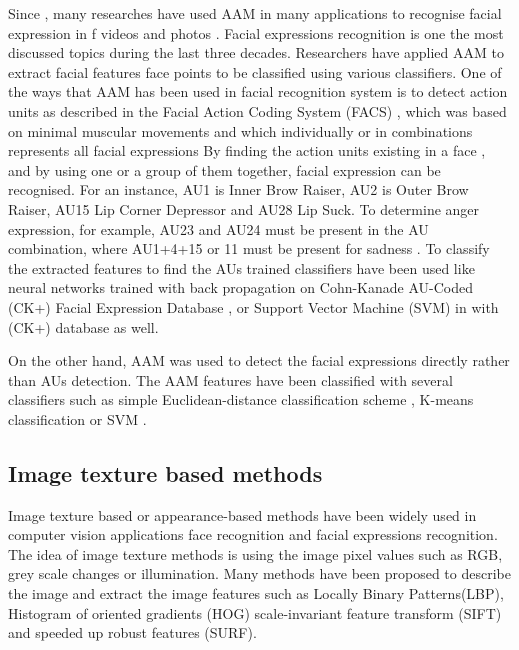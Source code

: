Since \citet{edwards1998interpreting}, many researches have used AAM in many applications to  recognise facial expression in f videos \cite{sung2006real, martin2008real} and photos \cite{kanade2000comprehensive, van2005model,wu2013facial} . Facial expressions recognition is one the most discussed topics during the last three decades. Researchers have applied AAM to extract facial features face points to be classified using various classifiers. One of the ways that AAM has been used in facial recognition system is to detect action units as described in the Facial Action Coding System (FACS) \cite{ekman1978facial}, which was based on minimal muscular movements  and which individually or in combinations  represents all facial expressions \citep{cohn1998feature, van2005model,lucey2010extended} By finding  the action units existing in a face , and by using one or a group of them together, facial expression can be recognised. For an instance, AU1 is Inner Brow Raiser, AU2 is Outer Brow Raiser, AU15 Lip Corner Depressor and AU28 Lip Suck. To determine anger expression, for example, AU23 and AU24 must be present in the AU combination, where AU1+4+15 or 11 must be present for sadness \cite{lucey2010extended}. 
To classify the extracted features to find the AUs trained classifiers have been used like neural networks trained with back propagation \citet{van2005model} on Cohn-Kanade AU-Coded (CK+) Facial Expression Database \citet{kanade2000comprehensive}, or Support Vector Machine (SVM) in \citet{lucey2010extended} with (CK+) database as well.     

On the other hand, AAM was used to detect the facial expressions directly rather than AUs detection. The AAM features have been classified with several classifiers such as simple Euclidean-distance classification scheme \cite{ratliff2008emotion},  K-means classification \cite{martins2008facial} or SVM \citet{pu2015facial}.






\subsection{Image texture based methods}
\label{sec:ch1_Imagetexture}
Image texture based or appearance-based methods have been widely used in computer vision applications face recognition and facial expressions recognition. The idea of image texture methods is using the image pixel values such as RGB, grey scale changes or illumination. Many methods have been proposed to describe the image and extract the image features such as Locally Binary Patterns(LBP), Histogram of oriented gradients (HOG) scale-invariant feature transform (SIFT) and speeded up robust features (SURF).






